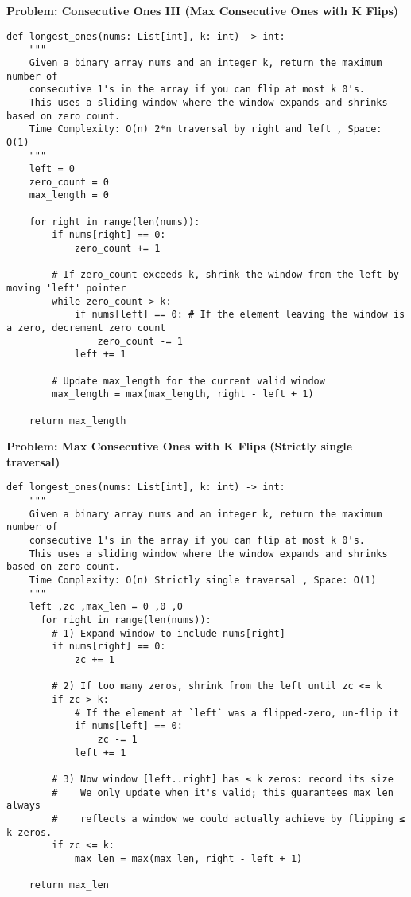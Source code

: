 \noindent\textbf{Problem: Consecutive Ones III (Max Consecutive Ones with K Flips)}
\begin{verbatim}
def longest_ones(nums: List[int], k: int) -> int:
    """
    Given a binary array nums and an integer k, return the maximum number of
    consecutive 1's in the array if you can flip at most k 0's.
    This uses a sliding window where the window expands and shrinks based on zero count.
    Time Complexity: O(n) 2*n traversal by right and left , Space: O(1)
    """
    left = 0
    zero_count = 0
    max_length = 0

    for right in range(len(nums)):
        if nums[right] == 0:
            zero_count += 1
        
        # If zero_count exceeds k, shrink the window from the left by moving 'left' pointer
        while zero_count > k:
            if nums[left] == 0: # If the element leaving the window is a zero, decrement zero_count
                zero_count -= 1
            left += 1
        
        # Update max_length for the current valid window
        max_length = max(max_length, right - left + 1)
        
    return max_length
\end{verbatim}
\noindent\textbf{Problem: Max Consecutive Ones with K Flips (Strictly single traversal) }
\begin{verbatim}
def longest_ones(nums: List[int], k: int) -> int:
    """
    Given a binary array nums and an integer k, return the maximum number of
    consecutive 1's in the array if you can flip at most k 0's.
    This uses a sliding window where the window expands and shrinks based on zero count. 
    Time Complexity: O(n) Strictly single traversal , Space: O(1)
    """
    left ,zc ,max_len = 0 ,0 ,0
      for right in range(len(nums)):
        # 1) Expand window to include nums[right]
        if nums[right] == 0:
            zc += 1

        # 2) If too many zeros, shrink from the left until zc <= k
        if zc > k:
            # If the element at `left` was a flipped‐zero, un‐flip it
            if nums[left] == 0:
                zc -= 1
            left += 1

        # 3) Now window [left..right] has ≤ k zeros: record its size
        #    We only update when it's valid; this guarantees max_len always
        #    reflects a window we could actually achieve by flipping ≤ k zeros.
        if zc <= k:
            max_len = max(max_len, right - left + 1)

    return max_len

\end{verbatim}
